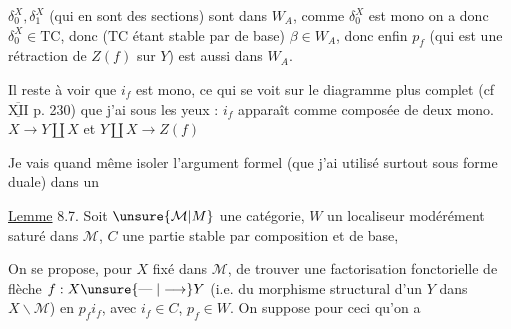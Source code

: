 
$\delta_0^X,\delta_1^X$ (qui en sont des sections) sont dans $W_A$, comme $\delta_0^X$ est mono on a donc $\delta_0^X\in\mathrm{TC}$, donc ($\mathrm{TC}$ étant stable par  de base) $\beta\in W_A$, donc enfin $p_f$ (qui est une rétraction de $Z(f)$ sur $Y$) est aussi dans $W_A$.

Il reste à voir que $i_f$ est mono, ce qui se voit sur le diagramme plus complet (cf $\overline{\underline{\mathrm{XII}}}$ p. 230\deleted{\unsure{)}}) que j'ai sous les yeux : $i_f$ apparaît comme composée de deux mono. $X\longrightarrow Y\amalg X$ et $Y\amalg X\longrightarrow Z(f)$


 Je vais quand même isoler l'argument formel  (que j'ai utilisé surtout sous forme duale) dans un

\uline{Lemme} 8.7. Soit $\unsure{\mathcal{M}|M}$ une catégorie, $W$ un localiseur modérément saturé dans $\mathcal{M}$, $C$ une partie stable par composition et   de base,

On se propose, pour $X$ fixé dans $\mathcal{M}$, de trouver une factorisation fonctorielle de  flèche $f:X\unsure{\mathrel{\text{---}}|\longrightarrow}Y$ (i.e. du morphisme structural d'un $Y$ dans $X\backslash\mathcal{M}$) en $p_f i_f$, avec $i_f\in C$, $p_f\in W$. On suppose  pour ceci qu'on a
